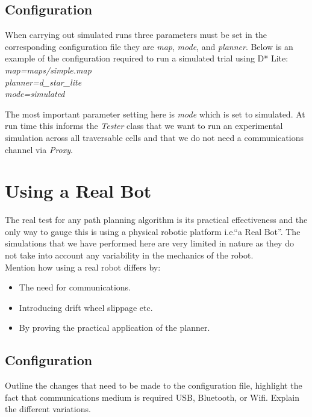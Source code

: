 \subsection{Configuration}
\noindent 
When carrying out simulated runs three parameters must be set in the corresponding configuration file they are \textit{map}, \textit{mode}, and \textit{planner}. Below is an example of the configuration required to run a simulated trial using D* Lite: \\

	\indent \textit{map=maps/simple.map \\}
	\indent \textit{planner=d\_star\_lite \\}
	\indent \textit{mode=simulated \\}

\noindent
The most important parameter setting here is \textit{mode} which is set to simulated. At run time this informs the \textit{Tester} class that we want to run an experimental simulation across all traversable cells and that we do not need a communications channel via \textit{Proxy}.


\section{Using a Real Bot}
\noindent
The real test for any path planning algorithm is its practical effectiveness and the only way to gauge this is using a physical robotic platform i.e.``a Real Bot''. The simulations that we have performed here are very limited in nature as they do not take into account any variability in the mechanics of the robot. \\
  
Mention how using a real robot differs by:

\begin{itemize}
\item The need for communications.
\item Introducing drift wheel slippage etc.
\item By proving the practical application of the planner.
\end{itemize}

\subsection{Configuration}
Outline the changes that need to be made to the configuration file, highlight the fact that communications medium is required USB, Bluetooth, or Wifi. Explain the different variations.

